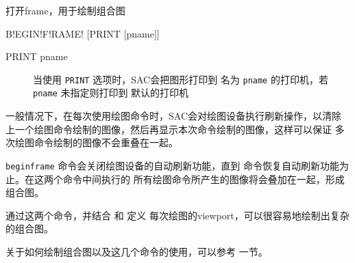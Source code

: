 \label{cmd:beginframe}

打开frame，用于绘制组合图

\begin{SACSTX}
B!EGIN!F!RAME! [PRINT [pname]]
\end{SACSTX}

\begin{description}
\item [PRINT pname] 当使用 \texttt{PRINT} 选项时，SAC会把图形打印到
    名为 \texttt{pname} 的打印机，若 \texttt{pname} 未指定则打印到
    默认的打印机
\end{description}

一般情况下，在每次使用绘图命令时，SAC会对绘图设备执行刷新操作，以清除
上一个绘图命令绘制的图像，然后再显示本次命令绘制的图像，这样可以保证
多次绘图命令绘制的图像不会重叠在一起。

\texttt{beginframe} 命令会关闭绘图设备的自动刷新功能，直到
 命令恢复自动刷新功能为止。在这两个命令中间执行的
所有绘图命令所产生的图像将会叠加在一起，形成组合图。

通过这两个命令，并结合  和  定义
每次绘图的viewport，可以很容易地绘制出复杂的组合图。

关于如何绘制组合图以及这几个命令的使用，可以参考
 一节。
